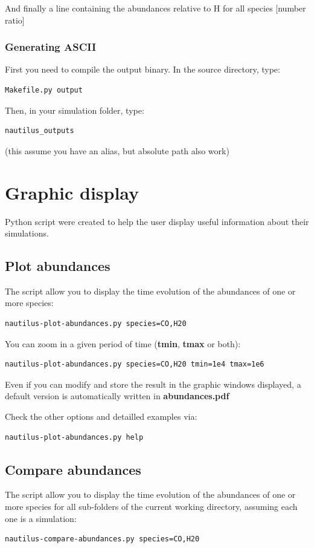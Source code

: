 \documentclass[english,a4paper,twoside]{article}
\begin{document}
And finally a line containing the abundances relative to H for all species [number ratio]

\subsubsection{Generating ASCII}
First you need to compile the output binary. In the source directory, type:
\begin{verbatim}
Makefile.py output
\end{verbatim}

Then, in your simulation folder, type:
\begin{verbatim}
nautilus_outputs
\end{verbatim}
(this assume you have an alias, but absolute path also work)

\section{Graphic display}\label{sec:graphic-display}
Python script were created to help the user display useful information about their simulations. 

\subsection{Plot abundances}
The script  allow you to display the time evolution of the abundances of one or more species:
\begin{verbatim}
nautilus-plot-abundances.py species=CO,H20
\end{verbatim}

You can zoom in a given period of time (\textbf{tmin}, \textbf{tmax} or both):
\begin{verbatim}
nautilus-plot-abundances.py species=CO,H20 tmin=1e4 tmax=1e6
\end{verbatim}

Even if you can modify and store the result in the graphic windows displayed, a default version is automatically written in \textbf{abundances.pdf} 

Check the other options and detailled examples via:
\begin{verbatim}
nautilus-plot-abundances.py help
\end{verbatim}

\subsection{Compare abundances}
The script  allow you to display the time evolution of the abundances of one or more species for all sub-folders of the current working directory, assuming each one is a simulation:
\begin{verbatim}
nautilus-compare-abundances.py species=CO,H20
\end{verbatim}
\end{document}
